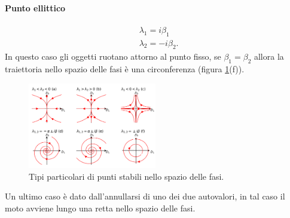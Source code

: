 \paragraph{Punto ellittico}%
\label{par:Punto ellittico}
\[\begin{aligned}
    & \lambda_1 = i\beta_1\\
    & \lambda_2= -i\beta_2
.\end{aligned}\]
In questo caso gli oggetti ruotano attorno al punto fisso, se $\beta_1=\beta_2$ allora la traiettoria nello spazio delle fasi è una circonferenza (figura \ref{fig:figures-15_lambda-png}(f)).
\begin{figure}[H]
    \centering
    \includegraphics[width=0.5\textwidth]{figures/15_lambda.png}
    \caption{\scriptsize Tipi particolari di punti stabili nello spazio delle fasi.}
    \label{fig:figures-15_lambda-png}
\end{figure}
Un ultimo caso è dato dall'annullarsi di uno dei due autovalori, in tal caso il moto avviene lungo una retta nello spazio delle fasi.
